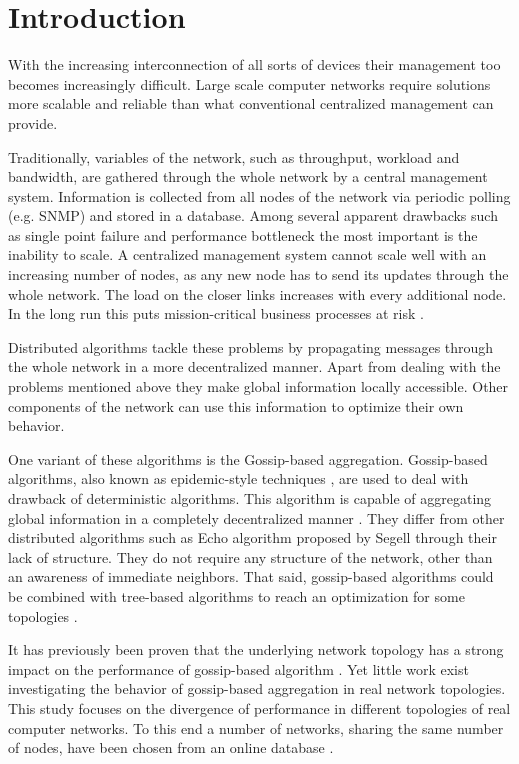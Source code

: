 \section{Introduction}
\label{sec:theory}
With the increasing interconnection of all sorts of devices their management too becomes increasingly difficult. Large scale computer networks require solutions more scalable and reliable than what conventional centralized management can provide.

Traditionally, variables of the network, such as throughput, workload and bandwidth, are gathered through the whole network by a central management system. Information is collected from all nodes of the network via periodic polling (e.g. SNMP) and stored in a database. Among several apparent drawbacks such as single point failure and performance bottleneck the most important is the inability to scale. A centralized management system cannot scale well with an increasing number of nodes, as any new node has to send its updates through the whole network. The load on the closer links increases with every additional node. In the long run this puts mission-critical business processes at risk \cite{Stadler529980}.

Distributed algorithms tackle these problems by propagating messages through the whole network in a more decentralized manner. Apart from dealing with the problems mentioned above they make global information locally accessible. Other components of the network can use this information to optimize their own behavior\cite{jelasity_gossip-based_2005}.

One variant of these algorithms is the Gossip-based aggregation. Gossip-based algorithms, also known as epidemic-style techniques \cite{I.Gupta2006}, are used to deal with drawback of deterministic algorithms. This algorithm is capable of aggregating global information in a completely decentralized manner \cite{jelasity_gossip-based_2005}. They differ from other distributed algorithms such as Echo algorithm proposed by Segell \cite{SegallG89} through their lack of structure. They do not require any structure of the network, other than an awareness of immediate neighbors. That said, gossip-based algorithms could be combined with tree-based algorithms to reach an optimization for some topologies \cite{KyasanurCG06}.

It has previously been proven that the underlying network topology has a strong impact on the performance of gossip-based algorithm \cite{5929538, jelasity_gossip-based_2005}. Yet little work exist investigating the behavior of gossip-based aggregation in real network topologies. This study focuses on the divergence of performance in different topologies of real computer networks. To this end a number of networks, sharing the same number of nodes, have been chosen from an online database \cite{knight_internet_2011}.

